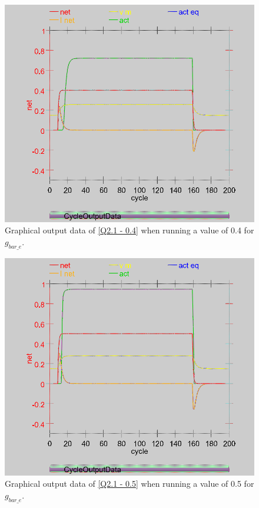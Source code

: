 \begin{multicols}{2}
\begin{figure}[H]
\centering
\includegraphics[scale=0.3]{Media/Main/EQ1/2.1.AG.png}
\caption{Graphical output data of \cref{Q2.1 - 0.4} when running a value of 0.4 for $g_{bar\_e}$.}
\label{Q2.1 - 0.4G}
\end{figure}

\begin{figure}[H]
\centering
\includegraphics[scale=0.3]{Media/Main/EQ1/2.1.AaG.png}
\caption{Graphical output data of \cref{Q2.1 - 0.5} when running a value of 0.5 for $g_{bar\_e}$.}
\label{Q2.1 - 0.5G}
\end{figure}


\end{multicols}
